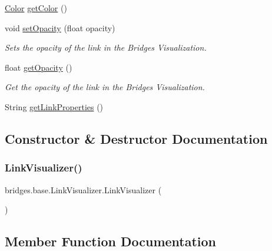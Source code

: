 \begin{DoxyCompactItemize}
\item 
\mbox{\hyperlink{classbridges_1_1base_1_1_color}{Color}} \mbox{\hyperlink{classbridges_1_1base_1_1_link_visualizer_a3ed52d98ecab99c6d8dd136fba913b7d}{get\+Color}} ()
\item 
void \mbox{\hyperlink{classbridges_1_1base_1_1_link_visualizer_ac0d59614dbc65ed0a19c25c493a1deaa}{set\+Opacity}} (float opacity)
\begin{DoxyCompactList}\small\item\em Sets the opacity of the link in the Bridges Visualization. \end{DoxyCompactList}\item 
float \mbox{\hyperlink{classbridges_1_1base_1_1_link_visualizer_a07cdd435a54e4b612ad63614f2a27a4a}{get\+Opacity}} ()
\begin{DoxyCompactList}\small\item\em Get the opacity of the link in the Bridges Visualization. \end{DoxyCompactList}\item 
String \mbox{\hyperlink{classbridges_1_1base_1_1_link_visualizer_ab64d9b7e2b99f7ebce80cbabfe4adf2a}{get\+Link\+Properties}} ()
\end{DoxyCompactItemize}


\subsection{Constructor \& Destructor Documentation}
\mbox{\label{classbridges_1_1base_1_1_link_visualizer_a0b69f099fa264ae9097b0efe278c6a1b}} 
\subsubsection{\texorpdfstring{Link\+Visualizer()}{LinkVisualizer()}}
{\footnotesize\ttfamily bridges.\+base.\+Link\+Visualizer.\+Link\+Visualizer (\begin{DoxyParamCaption}{ }\end{DoxyParamCaption})}



\subsection{Member Function Documentation}
\mbox{\label{classbridges_1_1base_1_1_link_visualizer_a3ed52d98ecab99c6d8dd136fba913b7d}} 
